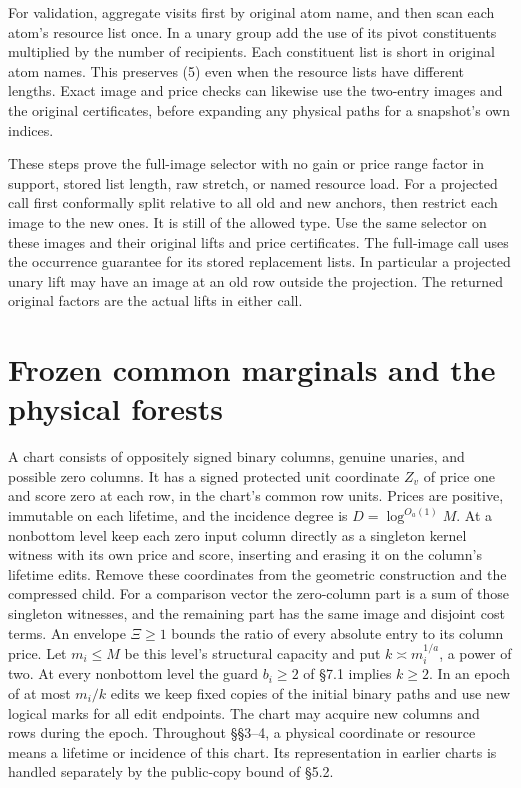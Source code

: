\documentclass[11pt]{article}
\begin{document}
For validation, aggregate visits first by original atom name, and then scan each atom's resource list once. In a unary group add the use of its pivot constituents multiplied by the number of recipients. Each constituent list is short in original atom names. This preserves (5) even when the resource lists have different lengths. Exact image and price checks can likewise use the two-entry images and the original certificates, before expanding any physical paths for a snapshot's own indices.

These steps prove the full-image selector with no gain or price range factor in support, stored list length, raw stretch, or named resource load. For a projected call first conformally split relative to all old and new anchors, then restrict each image to the new ones. It is still of the allowed type. Use the same selector on these images and their original lifts and price certificates. The full-image call uses the occurrence guarantee for its stored replacement lists. In particular a projected unary lift may have an image at an old row outside the projection. The returned original factors are the actual lifts in either call.

\hypertarget{frozen-common-marginals-and-the-physical-forests}{%
\section{Frozen common marginals and the physical forests}\label{frozen-common-marginals-and-the-physical-forests}}

A chart consists of oppositely signed binary columns, genuine unaries, and possible zero columns. It has a signed protected unit coordinate \(Z_v\) of price one and score zero at each row, in the chart's common row units. Prices are positive, immutable on each lifetime, and the incidence degree is \(D=\log^{O_a(1)}M\). At a nonbottom level keep each zero input column directly as a singleton kernel witness with its own price and score, inserting and erasing it on the column's lifetime edits. Remove these coordinates from the geometric construction and the compressed child. For a comparison vector the zero-column part is a sum of those singleton witnesses, and the remaining part has the same image and disjoint cost terms. An envelope \(\Xi\ge1\) bounds the ratio of every absolute entry to its column price. Let \(m_i\le M\) be this level's structural capacity and put \(k\asymp m_i^{1/a}\), a power of two. At every nonbottom level the guard \(b_i\ge2\) of §7.1 implies \(k\ge2\). In an epoch of at most \(m_i/k\) edits we keep fixed copies of the initial binary paths and use new logical marks for all edit endpoints. The chart may acquire new columns and rows during the epoch. Throughout §§3--4, a physical coordinate or resource means a lifetime or incidence of this chart. Its representation in earlier charts is handled separately by the public-copy bound of §5.2.
\end{document}

